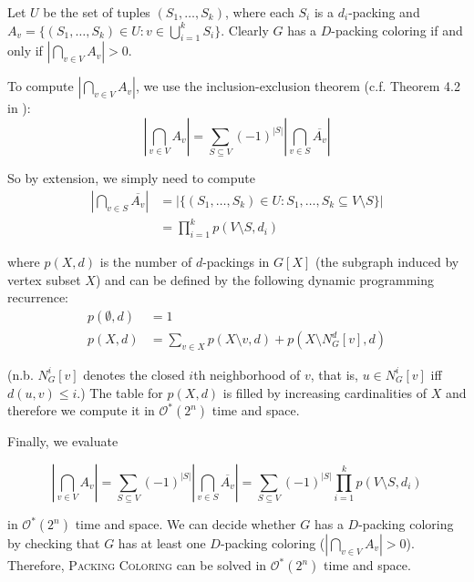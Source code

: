 \documentclass[10pt, a4paper]{article}
\theoremstyle{definition}
\newcommand{\mcO}{\mathcal{O}}
\begin{document}
Let $U$ be the set of tuples $(S_1, \dotsc, S_k)$, where each $S_i$ is a $d_i$-packing and $A_v = \{ (S_1, \dotsc, S_k) \in U : v \in \bigcup_{i=1}^{k} S_i\}$. Clearly $G$ has a $D$-packing coloring if and only if $\left | \bigcap_{v \in V} A_v \right | > 0$.

To compute $\left | \bigcap_{v \in V} A_v \right |$, we use the inclusion-exclusion theorem (c.f. Theorem 4.2 in \cite{Fomin2010}):
\begin{equation} \label{eq:incl_excl}
	\left | \bigcap_{v \in V} A_v \right | = \sum_{S \subseteq V} (-1)^{|S|} \left | \bigcap_{v \in S} \overline{A_v} \right | 
\end{equation}

So by extension, we simply need to compute 
\begin{align*}
	\left | \bigcap_{v \in S} \overline{A_v} \right | &= \left | \{ (S_1, \dotsc, S_k) \in U : S_1, \dotsc, S_k \subseteq V \setminus S \} \right | \\
													  &= \prod_{i=1}^{k} p(V \setminus S, d_i)
\end{align*}

where $p(X, d)$ is the number of $d$-packings in $G[X]$ (the subgraph induced by vertex subset $X$) and can be defined by the following dynamic programming recurrence:
\begin{align*}
	p(\emptyset, d) &= 1 \\
	p(X, d) &= \sum_{v \in X} p(X \setminus {v}, d) + p(X \setminus N_G^d[v], d)   
\end{align*}

(n.b. $N_G^i[v]$ denotes the closed $i$th neighborhood of $v$, that is, $u \in N_G^i[v]$ iff $d(u, v) \leq i$.) The table for $p(X, d)$ is filled by increasing cardinalities of $X$ and therefore we compute it in $\mcO^*(2^n)$ time and space. 

Finally, we evaluate

\begin{equation} \label{eq:incl_excl_final}
	\left | \bigcap_{v \in V} A_v \right | 
	= \sum_{S \subseteq V} (-1)^{|S|} \left | \bigcap_{v \in S} \overline{A_v} \right | 
	= \sum_{S \subseteq V} (-1)^{|S|} \prod_{i=1}^{k} p(V \setminus S, d_i)
\end{equation}

in $\mcO^*(2^n)$ time and space. We can decide whether $G$ has a $D$-packing coloring by checking that $G$ has at least one $D$-packing coloring ($\left | \bigcap_{v \in V} A_v \right | > 0$). Therefore, \textsc{Packing Coloring} can be solved in $\mcO^*(2^n)$ time and space.
\end{document}
